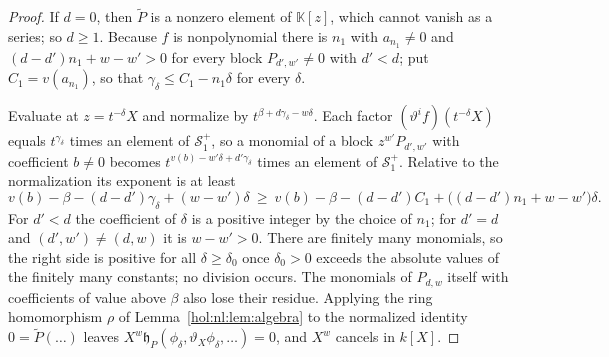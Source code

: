 \documentclass[11pt]{article}
\numberwithin{equation}{section}
\theoremstyle{definition}
\theoremstyle{remark}
\newcommand{\KK}{\mathbb K}
\newcommand{\Sfam}{\mathcal S}
\begin{document}
\begin{proof}
If $d=0$, then $\widetilde P$ is a nonzero element of $\KK[z]$, which cannot
vanish as a series; so $d\ge1$. Because $f$ is nonpolynomial there is $n_1$ with
$a_{n_1}\ne0$ and $(d-d')n_1+w-w'>0$ for every block $P_{d',w'}\ne0$ with
$d'<d$; put $C_1=v(a_{n_1})$, so that $\gamma_\delta\le C_1-n_1\delta$ for
every $\delta$.

Evaluate at $z=t^{-\delta}X$ and normalize by $t^{\beta+d\gamma_\delta-w\delta}$.
Each factor $(\vartheta^if)(t^{-\delta}X)$ equals $t^{\gamma_\delta}$ times an
element of $\Sfam_1^+$, so a monomial of a block $z^{w'}P_{d',w'}$ with
coefficient $b\ne0$ becomes $t^{v(b)-w'\delta+d'\gamma_\delta}$ times an element
of $\Sfam_1^+$. Relative to the normalization its exponent is at least
\begin{equation}\label{hol:ot:eq:gapbound}
 v(b)-\beta-(d-d')\gamma_\delta+(w-w')\delta
 \ \ge\ v(b)-\beta-(d-d')C_1+\bigl((d-d')n_1+w-w'\bigr)\delta .
\end{equation}
For $d'<d$ the coefficient of $\delta$ is a positive integer by the choice of
$n_1$; for $d'=d$ and $(d',w')\ne(d,w)$ it is $w-w'>0$. There are finitely many
monomials, so the right side is positive for all $\delta\ge\delta_0$ once
$\delta_0>0$ exceeds the absolute values of the finitely many constants; no
division occurs. The monomials of $P_{d,w}$ itself with coefficients of value
above $\beta$ also lose their residue. Applying the ring homomorphism $\rho$ of
Lemma~\ref{hol:nl:lem:algebra} to the normalized identity $0=\widetilde P(\ldots)$
leaves $X^w\mathfrak h_P(\phi_\delta,\vartheta_X\phi_\delta,\ldots)=0$, and
$X^w$ cancels in $k[X]$.
\end{proof}
\end{document}
